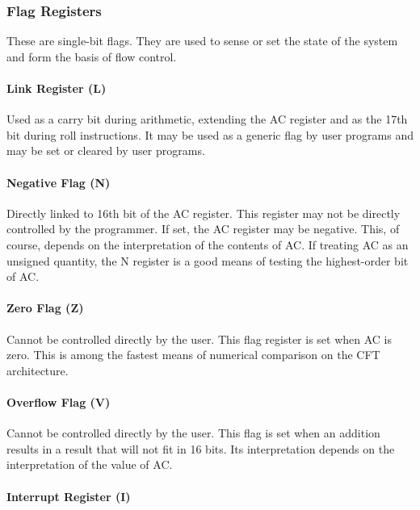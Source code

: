 \documentclass[11pt,a4paper,twocolumns]{article}
\newcommand\register[1]{\textsf{#1}}
\newcommand\A{\register{AC}}
\newcommand\Lreg{\register{L}}
\newcommand\Ireg{\register{I}}
\newcommand\Zreg{\register{Z}}
\newcommand\Vreg{\register{V}}
\newcommand\Nreg{\register{N}}
\begin{document}
\subsubsection{Flag Registers}

These are single-bit flags. They are used to sense or set the state of
the system and form the basis of flow control.

\paragraph{Link Register (\Lreg)}

Used as a carry bit during arithmetic, extending the \A{} register and
as the 17th bit during roll instructions. It may be used as a generic
flag by user programs and may be set or cleared by user programs.

\paragraph{Negative Flag (\Nreg)}

Directly linked to 16th bit of the \A{} register. This register may
not be directly controlled by the programmer. If set, the \A{}
register may be negative. This, of course, depends on the
interpretation of the contents of \A{}. If treating \A{} as an
unsigned quantity, the \Nreg{} register is a good means of testing the
highest-order bit of \A{}.

\paragraph{Zero Flag (\Zreg)}

Cannot be controlled directly by the user. This flag register is set
when \A{} is zero. This is among the fastest means of numerical
comparison on the CFT architecture.

\paragraph{Overflow Flag (\Vreg)}

Cannot be controlled directly by the user. This flag is set when an
addition results in a result that will not fit in 16 bits. Its
interpretation depends on the interpretation of the value of \A.

\paragraph{Interrupt Register (\Ireg)}
\end{document}
